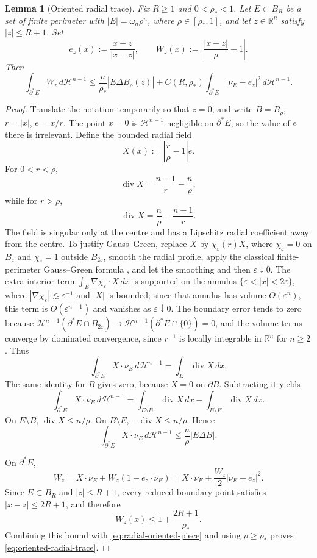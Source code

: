 \documentclass[11pt]{amsart}
\newtheorem{lemma}[theorem]{Lemma}
\theoremstyle{definition}
\newcommand{\R}{\mathbb R}
\newcommand{\rstar}{\rho_*}
\newcommand{\eps}{\varepsilon}
\newcommand{\Hn}{\mathcal H^{n-1}}
\begin{document}
\begin{lemma}[Oriented radial trace]\label{lem:oriented-radial-trace}
Fix \(R\ge1\) and \(0<\rstar<1\).  Let \(E\subset B_R\) be a set of finite
perimeter with \(|E|=\omega_n\rho^n\), where \(\rho\in[\rstar,1]\), and
let \(z\in\R^n\) satisfy \(|z|\le R+1\).  Set
\[
   e_z(x):=\frac{x-z}{|x-z|},\qquad
   W_z(x):=\left|\frac{|x-z|}{\rho}-1\right|.
\]
Then
\begin{equation}\label{eq:oriented-radial-trace}
   \int_{\partial^*E} W_z\,d\Hn
   \le
   \frac{n}{\rstar}|E\Delta B_\rho(z)|
   +
   C(R,\rstar)
   \int_{\partial^*E}|\nu_E-e_z|^2\,d\Hn .
\end{equation}
\end{lemma}

\begin{proof}
Translate the notation temporarily so that \(z=0\), and write
\(B=B_\rho\), \(r=|x|\), \(e=x/r\).  The point \(x=0\) is
\(\Hn\)-negligible on \(\partial^*E\), so the value of \(e\) there is
irrelevant.  Define the bounded radial field
\[
   X(x):=\left|\frac{r}{\rho}-1\right|e .
\]
For \(0<r<\rho\),
\[
   \operatorname{div}X=\frac{n-1}{r}-\frac n\rho,
\]
while for \(r>\rho\),
\[
   \operatorname{div}X=\frac n\rho-\frac{n-1}{r}.
\]
The field is singular only at the centre and has a Lipschitz radial
coefficient away from the centre.  To justify Gauss--Green, replace \(X\)
by \(\chi_\eps(r)X\), where \(\chi_\eps=0\) on \(B_\eps\) and
\(\chi_\eps=1\) outside \(B_{2\eps}\), smooth the radial profile, apply the
classical finite-perimeter Gauss--Green formula \cite{Maggi2012}, and let the
smoothing and then \(\eps\downarrow0\).  The extra interior term
\(\int_E\nabla\chi_\eps\cdot X\,dx\) is supported on the annulus
\(\{\eps<|x|<2\eps\}\), where \(|\nabla\chi_\eps|\lesssim\eps^{-1}\) and
\(|X|\) is bounded; since that annulus has volume \(O(\eps^n)\), this term is
\(O(\eps^{n-1})\) and vanishes as \(\eps\downarrow0\).  The boundary error
tends to zero because
\(\Hn(\partial^*E\cap B_{2\eps})\to \Hn(\partial^*E\cap\{0\})=0\), and the
volume terms converge by dominated convergence, since \(r^{-1}\) is locally
integrable in \(\R^n\) for \(n\ge2\).  Thus
\[
   \int_{\partial^*E}X\cdot\nu_E\,d\Hn
   =
   \int_E\operatorname{div}X\,dx .
\]
The same identity for \(B\) gives zero, because \(X=0\) on \(\partial B\).
Subtracting it yields
\[
   \int_{\partial^*E}X\cdot\nu_E\,d\Hn
   =
   \int_{E\setminus B}\operatorname{div}X\,dx
   -
   \int_{B\setminus E}\operatorname{div}X\,dx .
\]
On \(E\setminus B\), \(\operatorname{div}X\le n/\rho\).  On
\(B\setminus E\), \(-\operatorname{div}X\le n/\rho\).  Hence
\begin{equation}\label{eq:radial-oriented-piece}
   \int_{\partial^*E}X\cdot\nu_E\,d\Hn
   \le \frac n\rho |E\Delta B|.
\end{equation}

On \(\partial^*E\),
\[
   W_z = X\cdot\nu_E + W_z(1-e_z\cdot\nu_E)
       = X\cdot\nu_E + \frac{W_z}{2}|\nu_E-e_z|^2 .
\]
Since \(E\subset B_R\) and \(|z|\le R+1\), every reduced-boundary point
satisfies \(|x-z|\le2R+1\), and therefore
\[
   W_z(x)\le 1+\frac{2R+1}{\rstar}.
\]
Combining this bound with \eqref{eq:radial-oriented-piece} and using
\(\rho\ge\rstar\) proves \eqref{eq:oriented-radial-trace}.
\end{proof}
\end{document}

